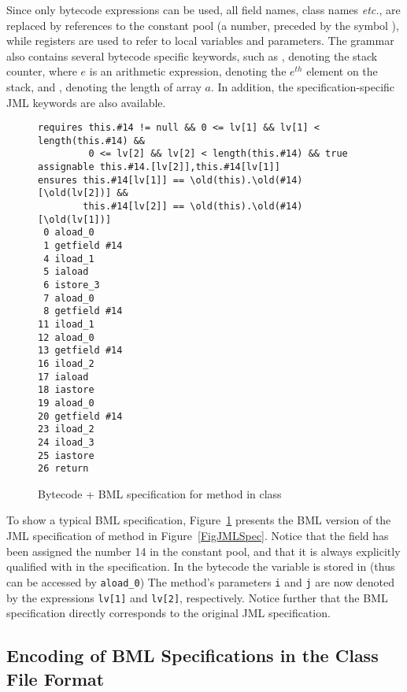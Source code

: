 Since only bytecode expressions can be used, all field names, class
names \emph{etc.}, are replaced by references to the constant pool (a
number, preceded by the symbol \codeHook{\#}), while registers are
used to refer to local variables and parameters. The grammar also
contains several bytecode specific keywords, such as ,
denoting the stack counter,  where \(e\) is an
arithmetic expression, denoting the \(e^{th}\) element on the stack, and
, denoting the length of array \(a\). In
addition, the specification-specific JML keywords are also available.




\begin{figure}[t]
{\small
\begin{verbatim}
requires this.#14 != null && 0 <= lv[1] && lv[1] < length(this.#14) &&
         0 <= lv[2] && lv[2] < length(this.#14) && true
assignable this.#14.[lv[2]],this.#14[lv[1]]
ensures this.#14[lv[1]] == \old(this).\old(#14)[\old(lv[2])] && 
        this.#14[lv[2]] == \old(this).\old(#14)[\old(lv[1])]
 0 aload_0
 1 getfield #14 
 4 iload_1
 5 iaload
 6 istore_3
 7 aload_0
 8 getfield #14 
11 iload_1
12 aload_0
13 getfield #14 
16 iload_2
17 iaload
18 iastore
19 aload_0
20 getfield #14 
23 iload_2
24 iload_3
25 iastore
26 return
\end{verbatim}
}
\vspace*{-1em}\caption{Bytecode + BML specification for method  in class }\label{FigBMLSpec}
\end{figure}

To show a typical BML specification, Figure~\ref{FigBMLSpec} presents
the BML version of the JML specification of method
 in Figure~\ref{FigJMLSpec}. 
Notice that the field  has been assigned the number 14
in the constant pool, and that it is always explicitly qualified with
 in the specification. In the bytecode the
variable  is stored in   (thus can be accessed
by \verb+aload_0+)
The method's parameters
\texttt{i} and \texttt{j} are now denoted by the expressions
\texttt{lv[1]} and \texttt{lv[2]}, respectively. Notice further that
the BML specification directly corresponds to the original JML
specification.


 
\subsection{Encoding of BML Specifications in the Class File Format}

